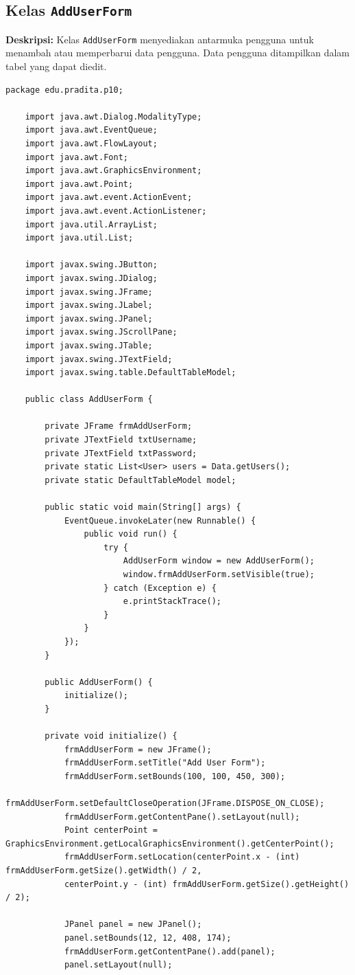 \subsection{Kelas \texttt{AddUserForm}}

\textbf{Deskripsi:} Kelas \texttt{AddUserForm} menyediakan antarmuka pengguna untuk menambah atau memperbarui data pengguna. Data pengguna ditampilkan dalam tabel yang dapat diedit.

\begin{lstlisting}[style=JavaStyle]
	package edu.pradita.p10;
	
	import java.awt.Dialog.ModalityType;
	import java.awt.EventQueue;
	import java.awt.FlowLayout;
	import java.awt.Font;
	import java.awt.GraphicsEnvironment;
	import java.awt.Point;
	import java.awt.event.ActionEvent;
	import java.awt.event.ActionListener;
	import java.util.ArrayList;
	import java.util.List;
	
	import javax.swing.JButton;
	import javax.swing.JDialog;
	import javax.swing.JFrame;
	import javax.swing.JLabel;
	import javax.swing.JPanel;
	import javax.swing.JScrollPane;
	import javax.swing.JTable;
	import javax.swing.JTextField;
	import javax.swing.table.DefaultTableModel;
	
	public class AddUserForm {
		
		private JFrame frmAddUserForm;
		private JTextField txtUsername;
		private JTextField txtPassword;
		private static List<User> users = Data.getUsers();
		private static DefaultTableModel model;
		
		public static void main(String[] args) {
			EventQueue.invokeLater(new Runnable() {
				public void run() {
					try {
						AddUserForm window = new AddUserForm();
						window.frmAddUserForm.setVisible(true);
					} catch (Exception e) {
						e.printStackTrace();
					}
				}
			});
		}
		
		public AddUserForm() {
			initialize();
		}
		
		private void initialize() {
			frmAddUserForm = new JFrame();
			frmAddUserForm.setTitle("Add User Form");
			frmAddUserForm.setBounds(100, 100, 450, 300);
			frmAddUserForm.setDefaultCloseOperation(JFrame.DISPOSE_ON_CLOSE);
			frmAddUserForm.getContentPane().setLayout(null);
			Point centerPoint = GraphicsEnvironment.getLocalGraphicsEnvironment().getCenterPoint();
			frmAddUserForm.setLocation(centerPoint.x - (int) frmAddUserForm.getSize().getWidth() / 2,
			centerPoint.y - (int) frmAddUserForm.getSize().getHeight() / 2);
			
			JPanel panel = new JPanel();
			panel.setBounds(12, 12, 408, 174);
			frmAddUserForm.getContentPane().add(panel);
			panel.setLayout(null);
			

\end{lstlisting}

